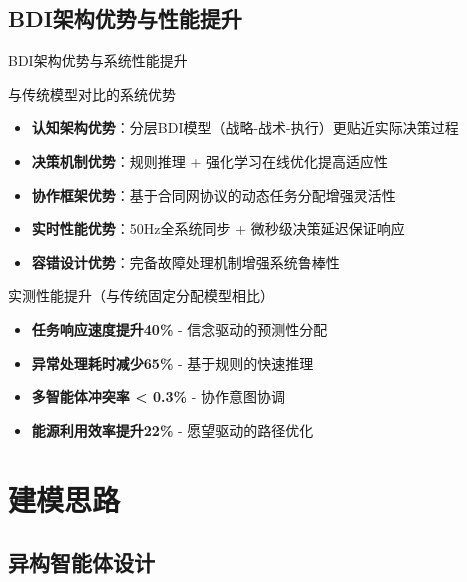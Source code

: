 \documentclass[
10pt,
aspectratio=169,
]{beamer}
\begin{document}
\subsection{BDI架构优势与性能提升}

\begin{frame}{BDI架构优势与系统性能提升}
    \begin{block}{与传统模型对比的系统优势}
        \begin{itemize}
            \item \textbf{认知架构优势}：分层BDI模型（战略-战术-执行）更贴近实际决策过程
            \item \textbf{决策机制优势}：规则推理 + 强化学习在线优化提高适应性
            \item \textbf{协作框架优势}：基于合同网协议的动态任务分配增强灵活性
            \item \textbf{实时性能优势}：50Hz全系统同步 + 微秒级决策延迟保证响应
            \item \textbf{容错设计优势}：完备故障处理机制增强系统鲁棒性
        \end{itemize}
    \end{block}
    
    \begin{alertblock}{实测性能提升}（与传统固定分配模型相比）
        \begin{itemize}
            \item \textbf{任务响应速度提升40\%} - 信念驱动的预测性分配
            \item \textbf{异常处理耗时减少65\%} - 基于规则的快速推理
            \item \textbf{多智能体冲突率 < 0.3\%} - 协作意图协调
            \item \textbf{能源利用效率提升22\%} - 愿望驱动的路径优化
        \end{itemize}
    \end{alertblock}
\end{frame}
\section{建模思路}
\subsection{异构智能体设计}
\end{document}

